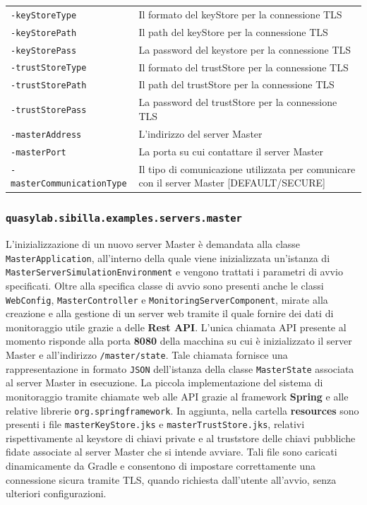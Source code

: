 \begin{table}[H]
    \begin{tabularx}{\linewidth}{ l X }
        \texttt{-keyStoreType}   & Il formato del keyStore per la connessione TLS   \\
        \texttt{-keyStorePath}   & Il path del keyStore per la connessione TLS       \\
        \texttt{-keyStorePass}   & La password del keystore per la connessione TLS   \\
        \texttt{-trustStoreType} & Il formato del trustStore per la connessione TLS \\
        \texttt{-trustStorePath} & Il path del trustStore per la connessione TLS     \\
        \texttt{-trustStorePass} & La password del trustStore per la connessione TLS \\
        \texttt{-masterAddress}  & L'indirizzo del server Master                     \\
        \texttt{-masterPort}     & La porta su cui contattare il server Master       \\
        \texttt{-masterCommunicationType} & Il tipo di comunicazione utilizzata per comunicare con il server Master {[}DEFAULT/SECURE{]}
    \end{tabularx}
\end{table}

\subsubsection{\texttt{quasylab.sibilla.examples.servers.master}}

L'inizializzazione di un nuovo server Master è demandata alla classe \texttt{MasterApplication}, all'interno della quale viene inizializzata un'istanza di \texttt{MasterServerSimulationEnvironment} e vengono trattati i parametri di avvio specificati.
Oltre alla specifica classe di avvio sono presenti anche le classi \texttt{WebConfig}, \texttt{MasterController} e \texttt{MonitoringServerComponent}, mirate alla creazione e alla gestione di un server web tramite il quale fornire dei dati di monitoraggio utile grazie a delle \textbf{Rest API}. L'unica chiamata API presente al momento risponde alla porta \textbf{8080} della macchina su cui è inizializzato il server Master e all'indirizzo \texttt{/master/state}. Tale chiamata fornisce una rappresentazione in formato \texttt{JSON} dell'istanza della classe \texttt{MasterState} associata al server Master in esecuzione.
La piccola implementazione del sistema di monitoraggio tramite chiamate web alle API grazie al framework \textbf{Spring} e alle relative librerie \texttt{org.springframework}.
In aggiunta, nella cartella \textbf{resources} sono presenti i file \texttt{masterKeyStore.jks} e \texttt{masterTrustStore.jks}, relativi rispettivamente al keystore di chiavi private e al truststore delle chiavi pubbliche fidate associate al server Master che si intende avviare. Tali file sono caricati dinamicamente da Gradle e consentono di impostare correttamente una connessione sicura tramite TLS, quando richiesta dall'utente all'avvio, senza ulteriori configurazioni.

